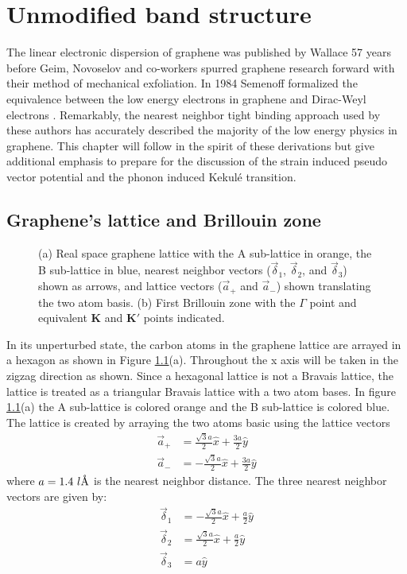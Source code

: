 \chapter{Unmodified band structure}
The linear electronic dispersion of graphene was published by Wallace\cite{Wallace1947} 57 years before Geim, Novoselov and co-workers spurred graphene research forward with their method of mechanical exfoliation\cite{Novoselov2004}.
In 1984 Semenoff formalized the equivalence between the low energy electrons in graphene and Dirac-Weyl electrons \cite{Semenoff1984}.
Remarkably, the nearest neighbor tight binding approach used by these authors has accurately described the majority of the low energy physics in graphene.
This chapter will follow in the spirit of these derivations but give additional emphasis to prepare for the discussion of the strain induced pseudo vector potential and the phonon induced Kekul\'e transition.

\section{Graphene's lattice and Brillouin zone}
\begin{figure}
	\begin{center}
	
	\end{center}
	\caption{\label{fig:TB:geometry} (a) Real space graphene lattice with the A sub-lattice in orange, the B sub-lattice in blue, nearest neighbor vectors ($\vec \delta_1$, $\vec \delta_2$, and $\vec \delta_3$) shown as arrows, and lattice vectors ($\vec a_+$ and $\vec a_-$) shown translating the two atom basis. (b) First Brillouin zone with the $\Gamma$ point and equivalent $\bm{K}$ and $\bm{K'}$ points indicated.}
\end{figure}

In its unperturbed state, the carbon atoms in the graphene lattice are arrayed in a hexagon as shown in Figure \ref{fig:TB:geometry}(a).
Throughout the x axis will be taken in the zigzag direction as shown.
Since a hexagonal lattice is not a Bravais lattice, the lattice is treated as a triangular Bravais lattice with a two atom bases.
In figure \ref{fig:TB:geometry}(a) the A sub-lattice is colored orange and the B sub-lattice is colored blue.
The lattice is created by arraying the two atoms basic using the lattice vectors 
\begin{align*}
	\vec{a}_+&= \frac{\sqrt{3}a}{2} \hat{x} + \frac{3a}{2} \hat{y} \\
	\vec{a}_-&=-\frac{\sqrt{3}a}{2} \hat{x} + \frac{3a}{2} \hat{y}
\end{align*}
where $a=1.4 \ l\textup{\AA}$ is the nearest neighbor distance.
The three nearest neighbor vectors are given by:
\begin{align*}
	\vec \delta_1&=-\frac{\sqrt{3} a}{2}\hat{x}+\frac{a}{2}\hat{y}\\
	\vec \delta_2&= \frac{\sqrt{3} a}{2}\hat{x}+\frac{a}{2}\hat{y}\\
	\vec \delta_3&=a \hat{y}
\end{align*}

